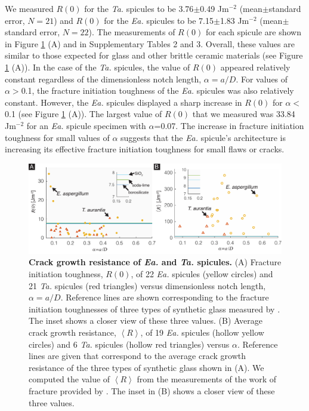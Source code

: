 \documentclass[12pt,onecolumn]{article}
\makeatletter
\newcommand{\TA}{\textit{Ta.\@}\xspace}
\newcommand{\EA}{\textit{Ea.\@}\xspace}
\makeatother
\begin{document}
We measured $R(0)$ for the \TA spicules to be 3.76$\pm$0.49 Jm$^{-2}$ (mean$\pm$standard error, $N=21$) and $R(0)$ for the \EA spicules to be 7.15$\pm$1.83 Jm$^{-2}$ (mean$\pm$standard error, $N=22$). The measurements of $R(0)$ for each spicule are shown in Figure \ref{fig:R} (A) and in Supplementary Tables 2 and 3. Overall, these values are similar to those expected for glass and other brittle ceramic materials (see Figure \ref{fig:R} (A)). In the case of the \TA spicules, the value of $R(0)$ appeared relatively constant regardless of the dimensionless notch length, $\alpha=a/D$. For values of $\alpha>$0.1, the fracture initiation toughness of the \EA spicules was also relatively constant. However, the \EA spicules displayed a sharp increase in $R(0)$ for $\alpha<$0.1 (see Figure \ref{fig:R} (A)). The largest value of $R(0)$ that we measured was 33.84 Jm$^{-2}$ for an \EA spicule specimen with $\alpha$=0.07. The increase in fracture initiation toughness for small values of $\alpha$ suggests that the \EA spicule's architecture is increasing its effective fracture initiation toughness for small flaws or cracks.
%
			\begin{figure}[ht!]
			\centering
			\includegraphics[width=\textwidth]{../Figures/FigureR/Figure5_V8.pdf}
			\caption{\textbf{Crack growth resistance of \EA and \TA spicules.} (A) Fracture initiation toughness, $R(0)$, of 22 \EA spicules (yellow circles) and 21 \TA spicules (red triangles) versus dimensionless notch length, $\alpha=a/D$. Reference lines are shown corresponding to the fracture initiation toughnesses of three types of synthetic glass measured by \cite{wiederhorn1969fracture}. The inset shows a closer view of these three values. (B) Average crack growth resistance, $\left< R \right>$, of 19 \EA spicules (hollow yellow circles) and 6 \TA spicules (hollow red triangles) versus $\alpha$.  Reference lines are given that correspond to the average crack growth resistance of the three types of synthetic glass shown in (A). We computed the value of $\left< R \right>$ from the measurements of the work of fracture provided by \cite{wiederhorn1969fracture}. The inset in (B) shows a closer view of these three values.}
			\label{fig:R}
			\end{figure}
\end{document}
